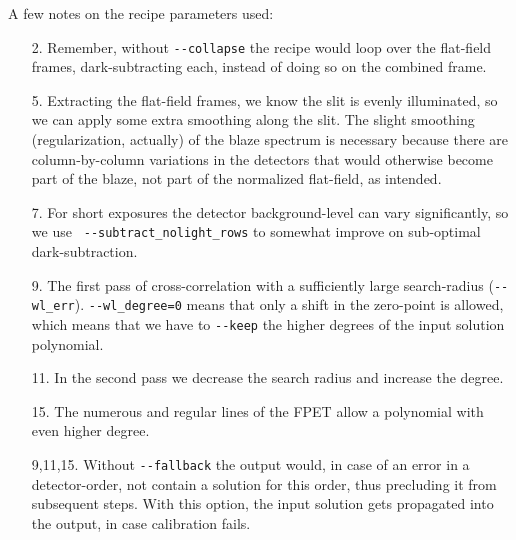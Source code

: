 A few notes on the recipe parameters used:
\begin{enumerate}
  \item[2.] Remember, without \verb!--collapse! the recipe would loop over the
  flat-field frames, dark-subtracting each, instead of doing so on the combined
  frame.
  \item[5.] Extracting the flat-field frames, we know the slit is evenly
  illuminated, so we can apply some extra smoothing along the slit. The slight
  smoothing (regularization, actually) of the blaze spectrum is necessary
  because there are column-by-column variations in the detectors that would
  otherwise become part of the blaze, not part of the normalized flat-field, as
  intended.
  \item[7.] For short exposures the detector background-level can vary
  significantly, so we use \linebreak \verb! --subtract_nolight_rows! to somewhat improve
  on sub-optimal dark-subtraction.
  \item[9.] The first pass of cross-correlation with a sufficiently large
  search-radius (\verb!--wl_err!). \verb!--wl_degree=0! means that only a shift
  in the zero-point is allowed, which means that we have to \verb!--keep! the
  higher degrees of the input solution polynomial.
  \item[11.] In the second pass we decrease the search radius and increase the
  degree.
  \item[15.] The numerous and regular lines of the FPET allow a polynomial with
  even higher degree.
  \item[9,11,15.] Without \verb!--fallback! the output would, in case of an
  error in a detector-order, not contain a solution for this order, thus
  precluding it from subsequent steps. With this option, the input solution gets
  propagated into the output, in case calibration fails.
\end{enumerate}






